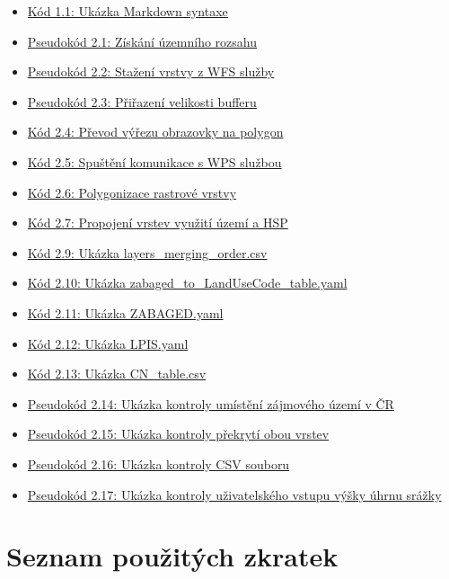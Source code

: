 \documentclass[a4paper,oneside,12pt]{book}
\begin{document}
\begin{itemize}
\item \hyperref[kod:md]{Kód 1.1: Ukázka Markdown syntaxe} 
\item \hyperref[kod:extent]{Pseudokód 2.1: Získání územního rozsahu} 
\item \hyperref[kod:wfs]{Pseudokód 2.2: Stažení vrstvy z WFS služby} 
\item \hyperref[kod:buffer]{Pseudokód 2.3: Přiřazení velikosti bufferu} 
\item \hyperref[kod:extenttoplg]{Kód 2.4: Převod výřezu obrazovky na polygon} 
\item \hyperref[kod:wps]{Kód 2.5: Spuštění komunikace s WPS službou} 
\item \hyperref[kod:polygonizace]{Kód 2.6: Polygonizace rastrové vrstvy} 
\item \hyperref[kod:intersection]{Kód 2.7: Propojení vrstev využití území a HSP} 
\item \hyperref[kod:cncsv]{Kód 2.9: Ukázka layers\_merging\_order.csv} 
\item \hyperref[kod:zabaged_to_LandUseCode_table.yaml]{Kód 2.10: Ukázka zabaged\_to\_LandUseCode\_table.yaml} 
\item \hyperref[kod:ZABAGED.yaml]{Kód 2.11: Ukázka ZABAGED.yaml} 
\item \hyperref[kod:LPIS.yaml]{Kód 2.12: Ukázka LPIS.yaml} 
\item \hyperref[kod:CN_table.csv]{Kód 2.13: Ukázka CN\_table.csv} 
\item \hyperref[kod:CR_check]{Pseudokód 2.14: Ukázka kontroly umístění zájmového území v ČR} 
\item \hyperref[kod:overlap_check]{Pseudokód 2.15: Ukázka kontroly překrytí obou vrstev} 
\item \hyperref[kod:csv_check]{Pseudokód 2.16: Ukázka kontroly CSV souboru} 
\item \hyperref[kod:runoff_check]{Pseudokód 2.17: Ukázka kontroly uživatelského vstupu výšky úhrnu srážky} 


\end{itemize}

\chapter*{Seznam použitých zkratek} \label{list_abr}
\end{document}
